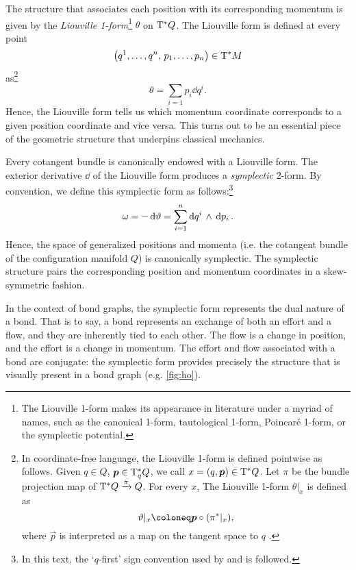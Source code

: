 The structure that associates each position with its corresponding momentum is given by the \emph{Liouville 1-form}\footnote
{
    The Liouville 1-form makes its appearance in literature under a myriad of names, such as the canonical 1-form, tautological 1-form, Poincaré 1-form, or the symplectic potential.
}
\(\theta\) on \(\mathrm{T}^*Q\). The Liouville form is defined at every point 
\[ \qty(q^1, \ldots, q^n,\, p_1, \ldots, p_n) \in \mathrm{T}^*M \] 
as\footnote
{
    In coordinate-free language, the Liouville 1-form is defined pointwise as follows. Given $q \in Q$, $\vec{p} \in \ctspace{q}{Q}$, we call $x = (q, \vec{p}) \in \ctbundle{Q}$. Let $\pi$ be the bundle projection map of $\mathrm{T}^*Q\xrightarrow[]{\pi}Q$. For every $x$, The Liouville 1-form $\theta\vert_x$ is defined as
    \begin{equation}
        \theta\vert_x \coloneq \vec{p} \circ \qty(\pi^*\vert_x),
    \end{equation}
    where $\vec{p}$ is interpreted as a map on the tangent space to $q$ \cite{Cannas2001}.
}
\begin{equation}
    \theta = \sum_{i = 1} p_i\dd{q^i}.
\end{equation}
Hence, the Liouville form tells us which momentum coordinate corresponds to a given position coordinate and vice versa. This turns out to be an essential piece of the geometric structure that underpins classical mechanics.

Every cotangent bundle is canonically endowed with a Liouville form. The exterior derivative $\dd{}$ of the Liouville form produces a \emph{symplectic} 2-form. By convention, we define this symplectic form as follows:\footnote
{
    In this text, the `\(q\)-first' sign convention used by \citet{Abraham1978} and \citet{Cannas2001} is followed.
}
\begin{equation}
     \omega = -\dd{\vartheta} = \sum_{i = 1}^n  \dd{q^i}\,\wedge\,\dd{p_i} .
\end{equation}
Hence, the space of generalized positions and momenta (i.e. the cotangent bundle of the configuration manifold \(Q\)) is canonically symplectic. The symplectic structure pairs the corresponding position and momentum coordinates in a skew-symmetric fashion.

In the context of bond graphs, the symplectic form represents the dual nature of a bond. That is to say, a bond represents an exchange of both an effort and a flow, and they are inherently tied to each other. The flow is a change in position, and the effort is a change in momentum. The effort and flow associated with a bond are conjugate: the symplectic form provides precisely the structure that is visually present in a bond graph (e.g. \cref{fig:ho}).

